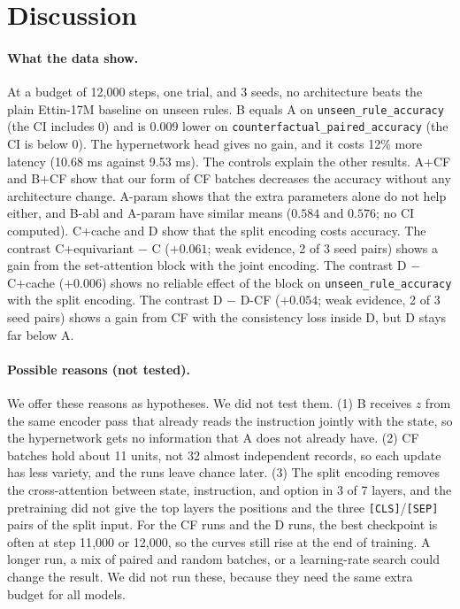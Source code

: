 \documentclass[11pt,a4paper]{article}
\newcommand{\ura}{\texttt{unseen\_\allowbreak rule\_\allowbreak accuracy}}
\newcommand{\cpa}{\texttt{counterfactual\_\allowbreak paired\_\allowbreak accuracy}}
\begin{document}
\section{Discussion}\label{sec:discussion}

\paragraph{What the data show.}
At a budget of 12{,}000 steps, one trial, and 3 seeds, no architecture beats the plain Ettin-17M baseline on unseen rules.
B equals A on \ura{} (the CI includes 0) and is $0.009$ lower on \cpa{} (the CI is below 0).
The hypernetwork head gives no gain, and it costs 12\% more latency (10.68 ms against 9.53 ms).
The controls explain the other results.
A+CF and B+CF show that our form of CF batches decreases the accuracy without any architecture change.
A-param shows that the extra parameters alone do not help either, and B-abl and A-param have similar means ($0.584$ and $0.576$; no CI computed).
C+cache and D show that the split encoding costs accuracy.
The contrast C+equivariant $-$ C ($+0.061$; weak evidence, 2 of 3 seed pairs) shows a gain from the set-attention block with the joint encoding.
The contrast D $-$ C+cache ($+0.006$) shows no reliable effect of the block on \ura{} with the split encoding.
The contrast D $-$ D-CF ($+0.054$; weak evidence, 2 of 3 seed pairs) shows a gain from CF with the consistency loss inside D, but D stays far below A.

\paragraph{Possible reasons (not tested).}
We offer these reasons as hypotheses.
We did not test them.
(1) B receives $z$ from the same encoder pass that already reads the instruction jointly with the state, so the hypernetwork gets no information that A does not already have.
(2) CF batches hold about 11 units, not 32 almost independent records, so each update has less variety, and the runs leave chance later.
(3) The split encoding removes the cross-attention between state, instruction, and option in 3 of 7 layers, and the pretraining did not give the top layers the positions and the three \texttt{[CLS]}/\texttt{[SEP]} pairs of the split input.
For the CF runs and the D runs, the best checkpoint is often at step 11{,}000 or 12{,}000, so the curves still rise at the end of training.
A longer run, a mix of paired and random batches, or a learning-rate search could change the result.
We did not run these, because they need the same extra budget for all models.
\end{document}
